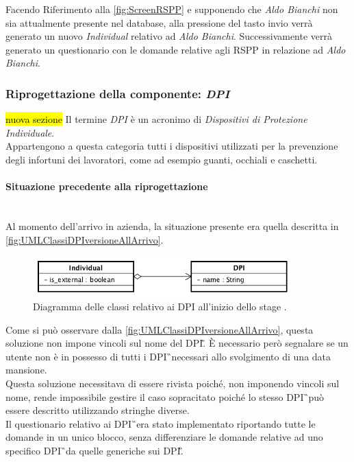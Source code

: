 	Facendo Riferimento alla \autoref{fig:ScreenRSPP} e  supponendo che \textit{Aldo Bianchi} non sia attualmente presente nel database, alla pressione del tasto invio verrà generato un nuovo \textit{Individual} relativo ad \textit{Aldo Bianchi}. Successivamente verrà generato un questionario con le domande relative agli RSPP in relazione ad \textit{Aldo Bianchi}.
	
\newpage
\subsubsection{Riprogettazione della componente: \textit{DPI}}
\hl{nuova sezione}
Il termine \textit{DPI} è un acronimo di \textit{Dispositivi di Protezione Individuale}. \\
Appartengono a questa categoria tutti i dispositivi utilizzati per la prevenzione degli infortuni dei lavoratori, come ad esempio guanti, occhiali e caschetti.\\

\paragraph*{Situazione precedente alla riprogettazione} \mbox{} \\
Al momento dell'arrivo in azienda, la situazione presente era quella descritta in \autoref{fig:UMLClassiDPIversioneAllArrivo}.
	\begin{figure}[H]
		\begin{center}
			\includegraphics[width=10cm]{Pics/UMLClassiDPIversioneAllArrivo.png}
			\caption{
			Diagramma delle classi relativo ai DPI all'inizio dello stage .}
			\label{fig:UMLClassiDPIversioneAllArrivo}
		\end{center}
	\end{figure}


Come si può osservare dalla \autoref{fig:UMLClassiDPIversioneAllArrivo}, questa soluzione non impone vincoli sul nome del \gls{DPI}\G.
È necessario però segnalare se un utente non è in possesso di tutti i \gls{DPI}\G\ necessari allo svolgimento di una data mansione.\\
Questa soluzione necessitava di essere rivista poiché, non imponendo vincoli sul nome, rende impossibile gestire il caso sopracitato poiché lo stesso \gls{DPI}\G\ può essere descritto utilizzando stringhe diverse.\\
Il questionario relativo ai \gls{DPI}\G\ era stato implementato riportando tutte le domande in un unico blocco, senza differenziare le domande relative ad uno specifico \gls{DPI}\G\ da quelle generiche sui \gls{DPI}\G.


